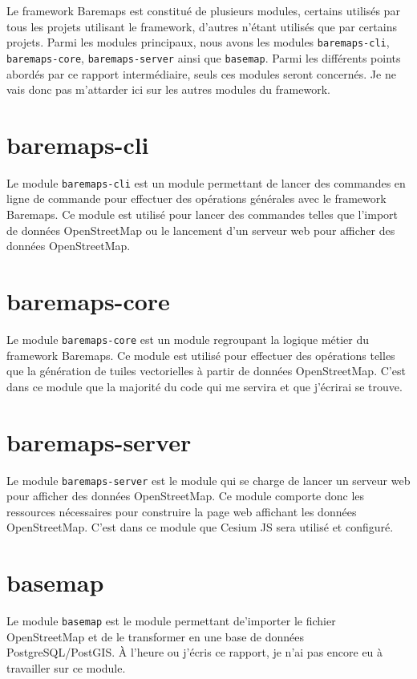 Le framework Baremaps est constitué de plusieurs modules, certains utilisés par tous les projets utilisant le framework, d'autres n'étant utilisés que par certains projets. Parmi les modules principaux, nous avons les modules \texttt{baremaps-cli}, \texttt{baremaps-core}, \texttt{baremaps-server} ainsi que \texttt{basemap}. Parmi les différents points abordés par ce rapport intermédiaire, seuls ces modules seront concernés. Je ne vais donc pas m'attarder ici sur les autres modules du framework.

\section{baremaps-cli}

Le module \texttt{baremaps-cli} est un module permettant de lancer des commandes en ligne de commande pour effectuer des opérations générales avec le framework Baremaps. Ce module est utilisé pour lancer des commandes telles que l'import de données OpenStreetMap ou le lancement d'un serveur web pour afficher des données OpenStreetMap.

\section{baremaps-core}

Le module \texttt{baremaps-core} est un module regroupant la logique métier du framework Baremaps. Ce module est utilisé pour effectuer des opérations telles que la génération de tuiles vectorielles à partir de données OpenStreetMap. C'est dans ce module que la majorité du code qui me servira et que j'écrirai se trouve.

\section{baremaps-server}

Le module \texttt{baremaps-server} est le module qui se charge de lancer un serveur web pour afficher des données OpenStreetMap. Ce module comporte donc les ressources nécessaires pour construire la page web affichant les données OpenStreetMap. C'est dans ce module que Cesium JS sera utilisé et configuré.

\section{basemap}
\label{sec:basemap}

Le module \texttt{basemap} est le module permettant de'importer le fichier OpenStreetMap et de le transformer en une base de données PostgreSQL/PostGIS. À l'heure ou j'écris ce rapport, je n'ai pas encore eu à travailler sur ce module.

